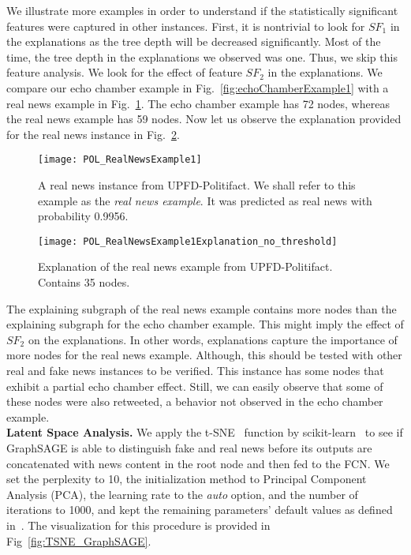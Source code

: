 We illustrate more examples in order to understand if the statistically significant features were captured in other instances. First, it is nontrivial to look for $SF_1$ in the explanations as the tree depth will be decreased significantly. Most of the time, the tree depth in the explanations we observed was one. Thus, we skip this feature analysis. We look for the effect of feature $SF_2$ in the explanations. We compare our echo chamber example in Fig.~\ref{fig:echoChamberExample1} with a real news example in Fig.~\ref{fig:POL_RealNewsExample1}. The echo chamber example has 72 nodes, whereas the real news example has 59 nodes. Now let us observe the explanation provided for the real news instance in Fig.~\ref{fig:POL_RealNewsExample1Explanation_no_threshold}.\\
\begin{figure}
    \centering
    \texttt{[image: POL\_RealNewsExample1]}
    \caption[A real news instance from UPFD-Politifact.]{A real news instance from UPFD-Politifact. We shall refer to this example as the \emph{real news example}. It was predicted as real news with probability 0.9956.}
    \label{fig:POL_RealNewsExample1}
\end{figure}
\begin{figure}
    \centering
    \texttt{[image: POL\_RealNewsExample1Explanation\_no\_threshold]}
    \caption[Explanation of the real news example from UPFD-Politifact]{Explanation of the real news example from UPFD-Politifact. Contains 35 nodes.}
    \label{fig:POL_RealNewsExample1Explanation_no_threshold}
\end{figure}
The explaining subgraph of the real news example contains more nodes than the explaining subgraph for the echo chamber example. This might imply the effect of $SF_2$ on the explanations. In other words, explanations capture the importance of more nodes for the real news example. Although, this should be tested with other real and fake news instances to be verified. This instance has some nodes that exhibit a partial echo chamber effect. Still, we can easily observe that some of these nodes were also retweeted, a behavior not observed in the echo chamber example.\\
\textbf{Latent Space Analysis.} We apply the t-SNE~\parencite{tSNE_vanDerMaaten} function by scikit-learn~\parencite{ScikitLearn_Pedregosa} to see if GraphSAGE is able to distinguish fake and real news before its outputs are concatenated with news content in the root node and then fed to the FCN. We set the perplexity to 10, the initialization method to Principal Component Analysis (PCA), the learning rate to the \emph{auto} option, and the number of iterations to 1000, and kept the remaining parameters' default values as defined in~\cite{ScikitTSNE_scikit}. The visualization for this procedure is provided in Fig~\ref{fig:TSNE_GraphSAGE}.
